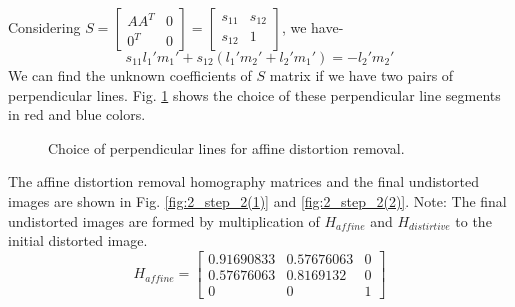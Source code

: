 \documentclass{article}
\begin{document}
Considering $S=\begin{bmatrix}AA^T & 0 \\ 0^T & 0\end{bmatrix}=\begin{bmatrix}s_{11} & s_{12} \\ s_{12} & 1\end{bmatrix}$, we have-
\begin{equation}
	s_{11}l_1'm_1' + s_{12}(l_1'm_2' + l_2'm_1') = -l_2'm_2'
\end{equation}
We can find the unknown coefficients of $S$ matrix if we have two pairs of perpendicular lines. Fig. \ref{fig:perpendicular_lines} shows the choice of these perpendicular line segments in red and blue colors.
\begin{figure}[!htbp]
     \centering
    \captionsetup[subfigure]{labelformat=empty}
    \caption{Choice of perpendicular lines for affine distortion removal.}
    \label{fig:perpendicular_lines}
\end{figure}
The affine distortion removal homography matrices and the final undistorted images are shown in Fig. \ref{fig:2_step_2(1)} and \ref{fig:2_step_2(2)}. Note: The final undistorted images are formed by multiplication of $H_{affine}$ and $H_{distirtive}$ to the initial distorted image.
\begin{equation*}
	H_{affine} = \begin{bmatrix}
	0.91690833 & 0.57676063 & 0\\ 0.57676063 & 0.8169132 & 0\\0 & 0 & 1
	\end{bmatrix}
\end{equation*}
\end{document}
